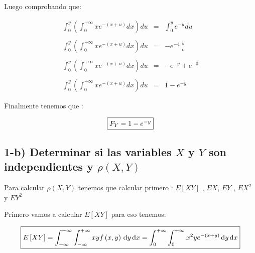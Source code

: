 \documentclass[12pt]{article}
\begin{document}
    Luego comprobando que:

    \begin{equation*}
        \begin{array}{rcl}
            \int_{0}^{y}\left(\int_{0}^{+\infty}xe^{-\left(x+u\right)}dx\right)du & = & \int_{0}^{y} e^{-u }du 
            \\
            \\
            \int_{0}^{y}\left(\int_{0}^{+\infty}xe^{-\left(x+u\right)}dx\right)du & = & -e^{-4}\vert_{o}^{y}
            \\
            \\
            \int_{0}^{y}\left(\int_{0}^{+\infty}xe^{-\left(x+u\right)}dx\right)du & = & -e^{-y}+e^{-0}
            \\
            \\
            \int_{0}^{y}\left(\int_{0}^{+\infty}xe^{-\left(x+u\right)}dx\right)du & = & 1 -e^{-y}
        \end{array}
    \end{equation*}

    Finalmente tenemos que :

    \begin{equation*}
        \fbox{$
        F_{Y}= 1 - e^{-y}
        $}
    \end{equation*}


    \subsection*{1-b) Determinar si las variables $X$ y $Y$ son independientes y $\rho \left(X,Y\right)$}
    
    \begin{flushleft}
        Para calcular $\rho \left(X,Y\right)$  tenemos que calcular primero : $E\left[XY\right]$ , $EX$, $EY$ , $EX^2$ y $EY^2$   
    \end{flushleft}
    

    \begin{flushleft}
        Primero vamos a calcular $E\left[XY\right]$ para eso tenemos: 
    \end{flushleft}

    \begin{equation*}
        \fbox{$
        E\left[XY\right] = \displaystyle \int_{- \infty}^{+ \infty} \int_{-\infty}^{+\infty} xy f\left(x,y\right) \,\mathrm{d}y  \,\mathrm{d}x  = \int_{0}^{+\infty} \int_{0}^{+\infty} x^2ye^{-\left(x+y\right)} \,\mathrm{d}y  \,\mathrm{d}x 
        $}
    \end{equation*}
\end{document}
